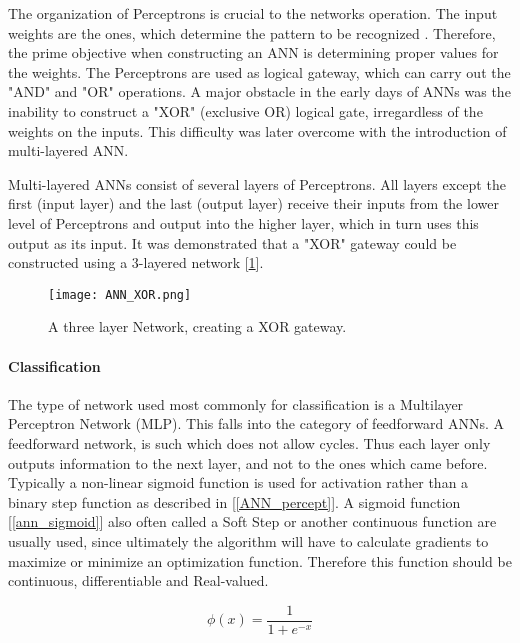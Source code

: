 	The organization of Perceptrons is crucial to the networks operation. The input weights are the ones, which determine the pattern to be recognized \cite{bishop1995neural}. Therefore, the prime objective when constructing an ANN is determining proper values for the weights. The Perceptrons are used as logical gateway, which can carry out the "AND" and "OR" operations. A major obstacle in the early days of ANNs was the inability to construct  a "XOR" (exclusive OR) logical gate, irregardless of the weights on the inputs. This difficulty was later overcome with the introduction of multi-layered ANN.
	
	Multi-layered ANNs consist of several layers of Perceptrons. All layers except the first (input layer) and the last (output layer) receive their inputs from the lower level of Perceptrons and output into the higher layer, which in turn uses this output as its input. It was demonstrated that a "XOR" gateway could be constructed using a 3-layered network [\ref{ANN_XOR}].
	
	\begin{figure}[h]
		\centering
		\captionsetup{width=0.8\textwidth}
		\texttt{[image: ANN\_XOR.png]}
		\caption[ANN XOR Perceptron-Network]{
			\footnotesize{
				A three layer Network, creating a XOR gateway.
			}
		} 
		\label{ANN_XOR}
	\end{figure}	
	
	
	\paragraph{Classification}
		The type of network used most commonly for classification is a Multilayer Perceptron Network (MLP). This falls into the category of feedforward ANNs. A feedforward network, is such which does not allow cycles. Thus each layer only outputs information to the next layer, and not to the ones which came before. Typically a non-linear sigmoid function is used for activation rather than a binary step function as described in [\ref{ANN_percept}]. A sigmoid function [\ref{ann_sigmoid}] also often called a Soft Step or another continuous function are usually used, since ultimately the algorithm will have to calculate gradients to maximize or minimize an optimization function. Therefore this function should be continuous, differentiable and Real-valued.
		
		\begin{equation}
			\phi(x) = \frac{1}{1+ e^{-x}}
			\label{ann_sigmoid}
		\end{equation}
			

